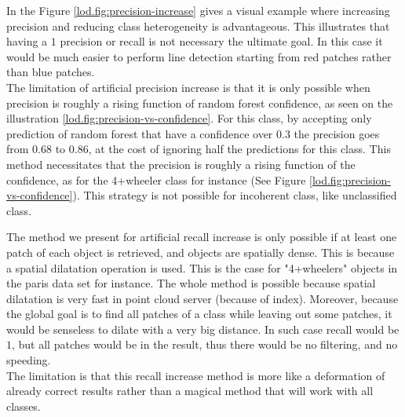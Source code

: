 		In the Figure \ref{lod.fig:precision-increase} gives a visual example where increasing precision and reducing class heterogeneity is advantageous. This illustrates that having a $1$ precision or recall is not necessary the ultimate goal.
		In this case it would be much easier to perform line detection starting from red patches rather than blue patches.
		\\
		The limitation of artificial precision increase is 
		that it is only possible when precision is roughly a rising function of random forest confidence, as seen on the illustration \ref{lod.fig:precision-vs-confidence}.
		For this class, by accepting only prediction of random forest that have a confidence over $0.3$ the precision goes from $0.68$ to $0.86$, at the cost of ignoring half the predictions for this class.
		This method necessitates that the precision is roughly a rising function of the confidence, as for the 4+wheeler class for instance (See Figure \ref{lod.fig:precision-vs-confidence}).   
		This strategy is not possible for incoherent class, like unclassified class.

		The method we present for artificial recall increase is only possible if at least one patch of each object is retrieved, and objects are spatially dense.
		This is because a spatial dilatation operation is used.
		This is the case for "4+wheelers" objects in the paris data set for instance.
		The whole method is possible because spatial dilatation is very fast in point cloud server (because of index).
		Moreover, because the global goal is to find all patches of a class while leaving out some patches,
		it would be senseless to dilate with a very big distance.
		In such case recall would be $1$, but all patches would be in the result, thus there would be no filtering, and no speeding.
		\\
		The limitation is that this recall increase method is more like a deformation of already correct results 
		rather than a magical method that will work with all classes.
				